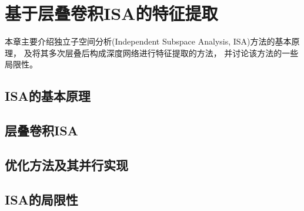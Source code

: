 
\chapter{基于层叠卷积ISA的特征提取\label{sec:ISA}}
本章主要介绍独立子空间分析(Independent Subspace Analysis, ISA)方法的基本原理，
及将其多次层叠后构成深度网络进行特征提取的方法\cite{wu2013unsupervised}，
并讨论该方法的一些局限性。

\section{ISA的基本原理}

\section{层叠卷积ISA}

\section{优化方法及其并行实现}

\section{ISA的局限性}


